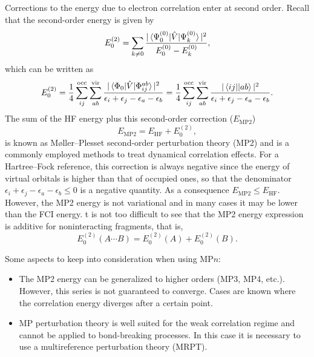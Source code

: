 \documentclass[../Main/chem532-notes.tex]{subfiles}
\begin{document}
Corrections to the energy due to electron correlation enter at second order.
Recall that the second-order energy is given by
\begin{equation}
E^{(2)}_0 = \sum_{k \neq 0}\frac{|\braket{\Psi_0^{(0)}|\hat{V}|\Psi_k^{(0)}}|^2}{E_0^{(0)} - E_k^{(0)}},
\end{equation}
which can be written as
\begin{equation}
E^{(2)}_0 = \frac{1}{4} \sum_{ij}^{\mathrm{occ}} \sum_{ab}^{\mathrm{vir}} 
\frac{ |\braket{\Phi_0|\hat{V}|\Phi_{ij}^{ab}}|^2}{\epsilon_i + \epsilon_j - \epsilon_a - \epsilon_b}
= \frac{1}{4} \sum_{ij}^{\mathrm{occ}} \sum_{ab}^{\mathrm{vir}} 
\frac{ |\bra{ij}\!\ket{ab}|^2}{\epsilon_i + \epsilon_j - \epsilon_a - \epsilon_b}.
\end{equation}
The sum of the HF energy plus this second-order correction ($E_{\mathrm{MP2}}$)
\begin{equation}
E_{\mathrm{MP2}} = E_{\mathrm{HF}} + E^{(2)}_0,
\end{equation}
is known as M{\o}ller--Plesset second-order perturbation theory (MP2) and is a commonly employed methods to treat dynamical correlation effects.
For a Hartree--Fock reference, this correction is always negative since the energy of virtual orbitals is higher than  that of occupied ones, so that the denominator $\epsilon_i + \epsilon_j - \epsilon_a - \epsilon_b \leq 0$ is a negative quantity.
As a consequence $E_{\mathrm{MP2}} \leq E_{\mathrm{HF}}$. However, the MP2 energy is not variational and in many cases it may be lower than the FCI energy.
 t is not too difficult to see that the MP2 energy expression is additive for noninteracting fragments, that is,
 \begin{equation}
E^{(2)}_0(A\cdots B) = E^{(2)}_0(A) + E^{(2)}_0(B).
\end{equation}

Some aspects to keep into consideration when using MP$n$:
\begin{itemize}
\item The MP2 energy can be generalized to higher orders (MP3, MP4, etc.). However, this series is not guaranteed to converge. Cases are known where the correlation energy diverges after a certain point.
\item MP perturbation theory is well suited for the weak correlation regime and cannot be applied to bond-breaking processes. In this case it is necessary to use a multireference perturbation theory (MRPT).
\end{itemize}
\end{document}
